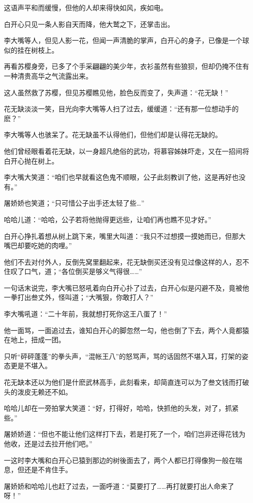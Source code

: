 \documentclass[12pt,oneside]{book}
\begin{document}
这语声平和而缓慢，但他的人却来得快如风，疾如电。

白开心只见一条人影自天而降，他大鹫之下，还掌击出。

李大嘴等人，但见人影一花，但闻一声清脆的掌声，白开心的身子，已像是一个球似的挂在树枝上。

再看苏樱身旁，已多了个手采翩翩的美少年，衣衫虽然有些狼狈，但却仍掩不住有一种清贵高华之气流露出来。

这人虽然救了苏樱，但见苏樱瞧见他，脸色反而变了，失声道：``花无缺！''

花无缺淡淡一笑，目光向李大嘴等人扫了过去，缓缓道：``还有那一位想动手的麽？''

李大嘴等人也骇呆了。花无缺虽不认得他们，但他们却是认得花无缺的。

他们曾经眼看着花无缺，以一身超凡绝俗的武功，将慕容姊妹吓走，又在一招间将白开心抛在树上。

李大嘴大笑道：``咱们也早就看这色鬼不顺眼，公子此刻教训了他，这是再好也没有。''

屠娇娇也笑道；``只可惜公子出手还太轻了些\ldots{}''

哈哈儿道：``哈哈，公子若将他抛得更远些，让咱们再也瞧不见才好。''

白开心挣扎着想从树上跳下来，嘴里大叫道：``我只不过想摸一摸她而已，但那大嘴巴却要吃她的肉哩。''

他们不去对付外人，反倒先窝里翻起来，花无缺倒买还没有见过像这样的人，忍不住叹了口气，道；``各位倒买是够义气得很\ldots\ldots{}''

一句话末说完，李大嘴已怒吼着向白开心扑了过去，白开心似是闪避不及，竟被他一拳打出叁丈外，怪叫道；``大嘴狠，你敢打人？''

李大嘴吼道：``二十年前，我就想打死你这王八蛋了！''

他一面骂，一面追过去，谁知白开心的脚忽然一勾，他也倒了下去，两个人竟都猿在地上，扭成一团。

只听``砰砰蓬蓬''的拳头声，``混帐王八''的怒骂声，骂的话固然不堪入耳，打架的姿态更是不堪入。

花无缺本还以为他们是什麽武林高手，此刻看来，却简直连可以为了叁文钱而打破头的泼皮无赖还不如。

哈哈儿却在一旁拍掌大笑道：``好，打得好，哈哈，快抓他的头发，对了，抓紧些。''

屠娇娇道：``但也不能让他们这样打下去，若是打死了一个，咱们岂非还得花钱为他收，还是过去拉开他们吧。''

一这时李大嘴和白开心已猿到那边的树後面去了，两个人都已打得像狗一般在喘息，但还是不肯住手。

屠娇娇和哈哈儿也赶了过去，一面呼道：``莫要打了\ldots\ldots 再打就要打出人命来了呀！''
\end{document}
